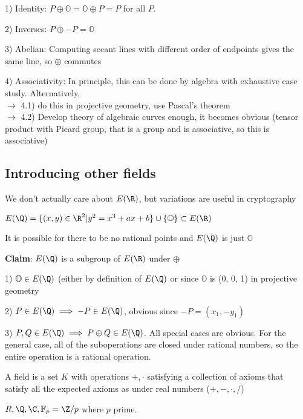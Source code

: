 \documentclass[10pt]{article}
\newcommand{\F}{\mathbb{F}}
\renewcommand{\O}{\mathbb{O}}
\begin{document}
1) Identity: $P \oplus \O = \O\oplus P = P$ for all $P$.

2) Inverses: $P \oplus -P = \O$

3) Abelian: Computing secant lines with different order of endpoints gives the same line, so $\oplus$ commutes

4) Associativity: In principle, this can be done by algebra with exhaustive case study. Alternatively, \\
$\to$ 4.1) do this in projective geometry, use Pascal's theorem\\
$\to$ 4.2) Develop theory of algebraic curves enough, it becomes obvious (tensor product with Picard group, that is a group and is associative, so this is associative)

\subsection{Introducing other fields}
\begin{rmk}
    We don't actually care about $E(\R)$, but variations are useful in cryptography
\end{rmk}

\begin{defn}
    $E(\Q) = \{(x, y) \in \R^2 | y^2 = x^3 + ax + b\} \cup \{\O\} \subset E(\R)$
\end{defn}

\begin{rmk}
    It is possible for there to be no rational points and $E(\Q)$ is just $\O$
\end{rmk}

\textbf{Claim}: $E(\Q)$ is a subgroup of $E(\R)$ under $\oplus$

1) $\O \in E(\Q)$ (either by definition of $E(\Q)$ or since $\O$ is (0, 0, 1) in projective geometry

2) $P \in E(\Q) \implies -P \in E(\Q)$, obvious since $-P = (x_1, -y_1)$

3) $P, Q \in E(\Q) \implies P\oplus Q \in E(\Q)$. All special cases are obvious. For the general case, all of the suboperations are closed under rational numbers, so the entire operation is a rational operation.

\begin{rmk}
    A field is a set $K$ with operations $+, \cdot$ satisfying a collection of axioms that satisfy all the expected axioms as under real numbers ($+, -, \cdot, /$)
\end{rmk}

\begin{exm*}
    $R, \Q, \C, \F_p = \Z/p$ where $p$ prime.
\end{exm*}
\end{document}
